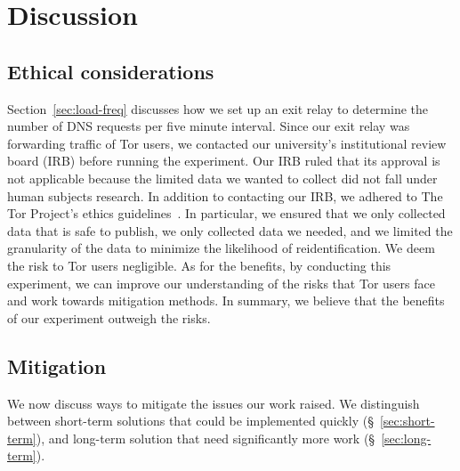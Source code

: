 \section{Discussion}
\label{sec:discussion}

\subsection{Ethical considerations}
\label{sec:ethics}
Section~\ref{sec:load-freq} discusses how we set up an exit relay to determine
the number of DNS requests per five minute interval.  Since our exit relay was
forwarding traffic of Tor users, we contacted our university's institutional
review board (IRB) before running the experiment.  Our IRB ruled that its
approval is not applicable because the limited data we wanted to collect did not
fall under human subjects research.  In addition to contacting our IRB, we
adhered to The Tor Project's ethics guidelines~\cite{ethics-guidelines}.  In
particular, \first we ensured that we only collected data that is safe to
publish, \second we only collected data we needed, and \third we limited the
granularity of the data to minimize the likelihood of reidentification.  We deem
the risk to Tor users negligible.  As for the benefits, by conducting this
experiment, we can improve our understanding of the risks that Tor users face
and work towards mitigation methods.  In summary, we believe that the benefits
of our experiment outweigh the risks.

\subsection{Mitigation}
We now discuss ways to mitigate the issues our work raised.  We distinguish
between short-term solutions that could be implemented quickly
(\S~\ref{sec:short-term}), and long-term solution that need significantly more
work (\S~\ref{sec:long-term}).

